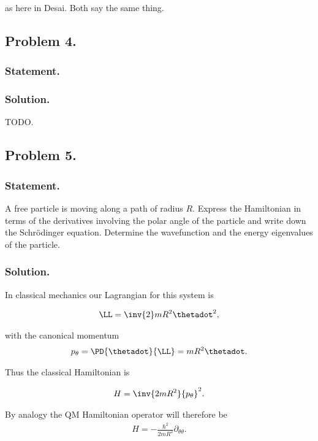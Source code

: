 as here in Desai.  Both say the same thing.

\subsection{Problem 4.}
\subsubsection{Statement.}
\subsubsection{Solution.}

TODO.
\subsection{Problem 5.}
\subsubsection{Statement.}

A free particle is moving along a path of radius $R$.  Express the Hamiltonian in terms of the derivatives involving the polar angle of the particle and write down the Schr\"{o}dinger equation.  Determine the wavefunction and the energy eigenvalues of the particle.

\subsubsection{Solution.}

In classical mechanics our Lagrangian for this system is

\begin{align}\label{eqn:desaiCh4:500}
\LL = \inv{2} m R^2 \thetadot^2,
\end{align}

with the canonical momentum
\begin{align}\label{eqn:desaiCh4:501}
p_\theta = \PD{\thetadot}{\LL} = m R^2 \thetadot.
\end{align}

Thus the classical Hamiltonian is

\begin{align}\label{eqn:desaiCh4:502}
H = \inv{2m R^2} {p_\theta}^2.
\end{align}

By analogy the QM Hamiltonian operator will therefore be
\begin{align}\label{eqn:desaiCh4:503}
H = -\frac{\hbar^2}{2m R^2} \partial_{\theta\theta}.
\end{align}

